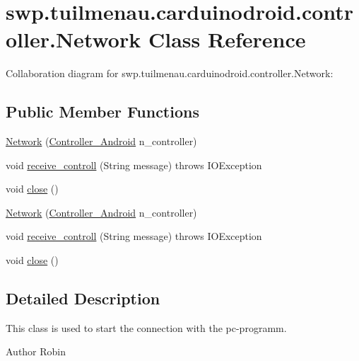 \hypertarget{classswp_1_1tuilmenau_1_1carduinodroid_1_1controller_1_1_network}{}\section{swp.\+tuilmenau.\+carduinodroid.\+controller.\+Network Class Reference}
\label{classswp_1_1tuilmenau_1_1carduinodroid_1_1controller_1_1_network}


Collaboration diagram for swp.\+tuilmenau.\+carduinodroid.\+controller.\+Network\+:
\subsection*{Public Member Functions}
\begin{DoxyCompactItemize}
\item 
\hyperlink{classswp_1_1tuilmenau_1_1carduinodroid_1_1controller_1_1_network_ab8d4c3dc6072ba6e6d96d0fd6c1b76e2}{Network} (\hyperlink{classswp_1_1tuilmenau_1_1carduinodroid_1_1controller_1_1_controller___android}{Controller\+\_\+\+Android} n\+\_\+controller)
\item 
void \hyperlink{classswp_1_1tuilmenau_1_1carduinodroid_1_1controller_1_1_network_a3bdf599c2a8dfadbe3b2d8e7c00b8ab0}{receive\+\_\+controll} (String message)  throws I\+O\+Exception 
\item 
void \hyperlink{classswp_1_1tuilmenau_1_1carduinodroid_1_1controller_1_1_network_a310032de4956f12176e2ab75d9d34851}{close} ()
\item 
\hyperlink{classswp_1_1tuilmenau_1_1carduinodroid_1_1controller_1_1_network_ab8d4c3dc6072ba6e6d96d0fd6c1b76e2}{Network} (\hyperlink{classswp_1_1tuilmenau_1_1carduinodroid_1_1controller_1_1_controller___android}{Controller\+\_\+\+Android} n\+\_\+controller)
\item 
void \hyperlink{classswp_1_1tuilmenau_1_1carduinodroid_1_1controller_1_1_network_a3bdf599c2a8dfadbe3b2d8e7c00b8ab0}{receive\+\_\+controll} (String message)  throws I\+O\+Exception 
\item 
void \hyperlink{classswp_1_1tuilmenau_1_1carduinodroid_1_1controller_1_1_network_a310032de4956f12176e2ab75d9d34851}{close} ()
\end{DoxyCompactItemize}


\subsection{Detailed Description}
This class is used to start the connection with the pc-\/programm. \begin{DoxyAuthor}{Author}
Robin 
\end{DoxyAuthor}


